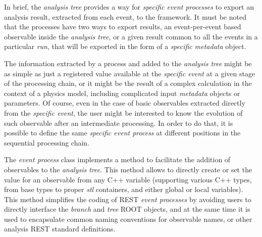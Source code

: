 In brief, the \emph{analysis tree} provides a way for \emph{specific event processes} to export an analysis result, extracted from each event, to the framework. It must be noted that the processes have two ways to export results, an event-per-event based observable inside the \emph{analysis tree}, or a given result common to all the events in a particular \emph{run}, that will be exported in the form of a \emph{specific metadata} object.

The information extracted by a process and added to the \emph{analysis tree} might be as simple as just a registered value available at the \emph{specific event} at a given stage of the processing chain, or it might be the result of a complex calculation in the context of a physics model, including complicated input \emph{metadata} objects or parameters. Of course, even in the case of basic observables extracted directly from the \emph{specific event}, the user might be interested to know the evolution of such observable after an intermediate processing. In order to do that, it is possible to define the same \emph{specific event process} at different positions in the sequential processing chain.




The \emph{event process} class implements a method to facilitate the addition of observables to the \emph{analysis tree}. This method allows to directly create or set the value for an observable from any C++ variable (supporting various C++ types, from base types to proper \emph{stl} containers, and either global or local variables). This method simplifies the coding of REST \emph{event processes} by avoiding users to directly interface the \emph{branch} and \emph{tree} ROOT objects, and at the same time it is used to encapsulate common naming conventions for observable names, or other analysis REST standard definitions.

